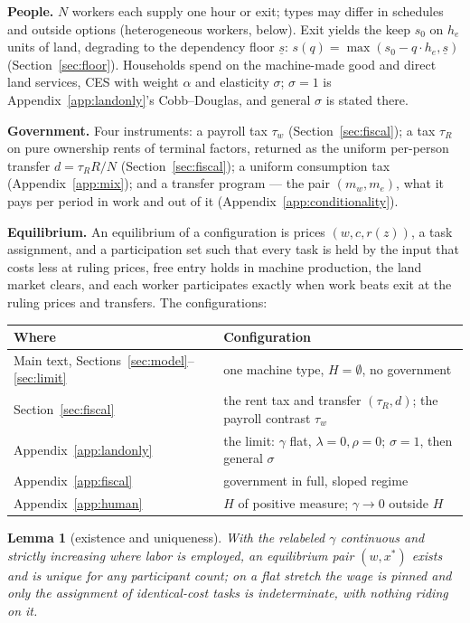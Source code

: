 \documentclass[12pt]{article}
\theoremstyle{plain}
\newtheorem{lemma}[proposition]{Lemma}
\begin{document}
\textbf{People.} $N$ workers each supply one hour or exit; types may differ in schedules and outside options (heterogeneous workers, below). Exit yields the keep $s_0$ on $h_e$ units of land, degrading to the dependency floor $\underline{s}$: $s(q) = \max(s_0 - q\cdot h_e, \underline{s})$ (Section~\ref{sec:floor}). Households spend on the machine-made good and direct land services, CES with weight $\alpha$ and elasticity $\sigma$; $\sigma = 1$ is Appendix~\ref{app:landonly}'s Cobb--Douglas, and general $\sigma$ is stated there.

\textbf{Government.} Four instruments: a payroll tax $\tau _w$ (Section~\ref{sec:fiscal}); a tax $\tau _R$ on pure ownership rents of terminal factors, returned as the uniform per-person transfer $d = \tau _R R/N$ (Section~\ref{sec:fiscal}); a uniform consumption tax (Appendix~\ref{app:mix}); and a transfer program --- the pair $(m_w,m_e)$, what it pays per period in work and out of it (Appendix~\ref{app:conditionality}).

\textbf{Equilibrium.} An equilibrium of a configuration is prices $(w,c,r(z))$, a task assignment, and a participation set such that every task is held by the input that costs less at ruling prices, free entry holds in machine production, the land market clears, and each worker participates exactly when work beats exit at the ruling prices and transfers. The configurations:

\begin{center}
{\small
\begin{tabular}{l p{8.6cm}}
\toprule
Where & Configuration \\
\midrule
Main text, Sections~\ref{sec:model}--\ref{sec:limit} & one machine type, $H = \emptyset$, no government \\
Section~\ref{sec:fiscal} & the rent tax and transfer $(\tau _R,d)$; the payroll contrast $\tau _w$ \\
Appendix~\ref{app:landonly} & the limit: $\gamma$ flat, $\lambda = 0, \rho = 0$; $\sigma = 1$, then general $\sigma$ \\
Appendix~\ref{app:fiscal} & government in full, sloped regime \\
Appendix~\ref{app:human} & $H$ of positive measure; $\gamma \to 0$ outside $H$ \\
\bottomrule
\end{tabular}
}
\end{center}

\begin{lemma}[existence and uniqueness]\label{lem:existence}
With the relabeled $\gamma$ continuous and strictly increasing where labor is employed, an equilibrium pair $(w, x^*)$ exists and is unique for any participant count; on a flat stretch the wage is pinned and only the assignment of identical-cost tasks is indeterminate, with nothing riding on it.
\end{lemma}
\end{document}
